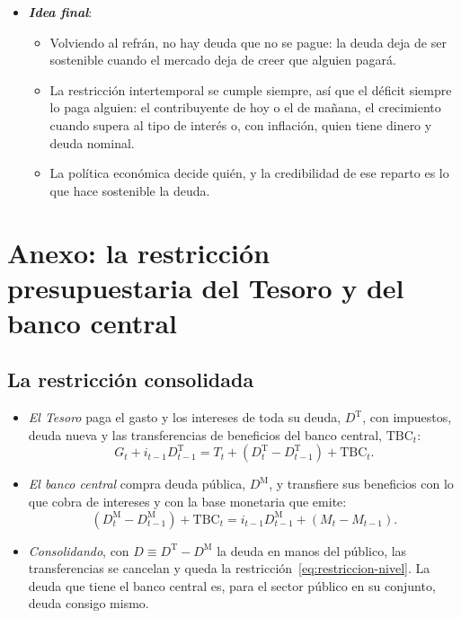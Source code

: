 \documentclass[11pt]{article}
\begin{document}
\begin{itemize}
\begin{itemize}
  \item Por eso lo prudente es bajar la deuda en los años de crecimiento nominal alto, con una consolidación gradual y creíble, y dejar actuar a los estabilizadores en las recesiones.
  \end{itemize}
\item \textbf{\emph{Idea final}}:
  \begin{itemize}
  \item Volviendo al refrán, no hay deuda que no se pague: la deuda deja de ser sostenible cuando el mercado deja de creer que alguien pagará.

  \item La restricción intertemporal se cumple siempre, así que el déficit siempre lo paga alguien: el contribuyente de hoy o el de mañana, el crecimiento cuando supera al tipo de interés o, con inflación, quien tiene dinero y deuda nominal.

  \item La política económica decide quién, y la credibilidad de ese reparto es lo que hace sostenible la deuda.
  \end{itemize}
\end{itemize}

\clearpage
\appendix

\section{Anexo: la restricción presupuestaria\cortetitulo{} del Tesoro y del banco central}\label{anexo:restriccion-walsh}

\subsection{La restricción consolidada}

\begin{itemize}
\item \emph{El Tesoro} paga el gasto y los intereses de toda su deuda, $D^{\mathrm T}$, con impuestos, deuda nueva y las transferencias de beneficios del banco central, $\mathrm{TBC}_t$\nocite{Walsh2017Monetary}:
  \begin{equation*}
  G_t+i_{t-1}D^{\mathrm T}_{t-1}=T_t+(D^{\mathrm T}_t-D^{\mathrm T}_{t-1})+\mathrm{TBC}_t .
  \end{equation*}
\item \emph{El banco central} compra deuda pública, $D^{\mathrm M}$, y transfiere sus beneficios con lo que cobra de intereses y con la base monetaria que emite:
  \begin{equation*}
  (D^{\mathrm M}_t-D^{\mathrm M}_{t-1})+\mathrm{TBC}_t=i_{t-1}D^{\mathrm M}_{t-1}+(M_t-M_{t-1}) .
  \end{equation*}
\item \emph{Consolidando}, con $D\equiv D^{\mathrm T}-D^{\mathrm M}$ la deuda en manos del público, las transferencias se cancelan y queda la restricción~\eqref{eq:restriccion-nivel}. La deuda que tiene el banco central es, para el sector público en su conjunto, deuda consigo mismo.\findemo
\end{itemize}
\end{document}
